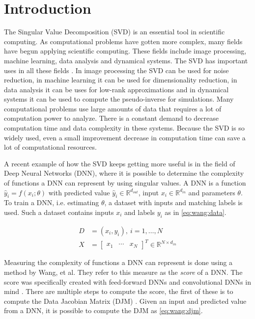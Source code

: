 \chapter {Introduction}

The Singular Value Decomposition (SVD) is an essential tool in scientific computing. As computational problems have gotten more complex, many fields have begun applying scientific computing. These fields include image processing, machine learning, data analysis and dynamical systems. The SVD has important uses in all these fields \cite{kutz:data}. In image processing the SVD can be used for noise reduction, in machine learning it can be used for dimensionality reduction, in data analysis it can be uses for low-rank approximations and in dynamical systems it can be used to compute the pseudo-inverse for simulations. Many computational problems use large amounts of data that requires a lot of computation power to analyze. There is a constant demand to decrease computation time and data complexity in these systems. Because the SVD is so widely used, even a small improvement decrease in computation time can save a lot of computational resources.

A recent example of how the SVD keeps getting more useful is in the field of Deep Neural Networks (DNN), where it is possible to determine the complexity of functions a DNN can represent by using singular values. A DNN is a function $\hat y_i = f(x_i; \theta)$ with predicted value $\hat y_i \in \mathbb{R}^{d_{out}}$, input $x_i \in \mathbb{R}^{d_{in}}$ and parameters $\theta$. To train a DNN, i.e. estimating $\theta$, a dataset with inputs and matching labels is used. Such a dataset contains inputs $x_i$ and labels $y_i$ as in \eqref{eq:wang:data}.

\begin{equation} \label{eq:wang:data}
  \begin{split}
    D &= {(x_i,y_i)},\ i=1,\dotsc,N \\
    X &=
    \begin{bmatrix}
      x_1 & \cdots & x_N
    \end{bmatrix}^T \in \mathbb{R}^{N \times d_{in}}
  \end{split}
\end{equation}

Measuring the complexity of functions a DNN can represent is done using a method by Wang, et al. They refer to this measure as the \textit{score} of a DNN. The score was specifically created with feed-forward DNNs and convolutional DNNs in mind \cite{icml16:wang:edjm}. There are multiple steps to compute the score, the first of these is to compute the Data Jacobian Matrix (DJM) \cite{icml16:wang:edjm}. Given an input and predicted value from a DNN, it is possible to compute the DJM as \eqref{eq:wang:djm}.

